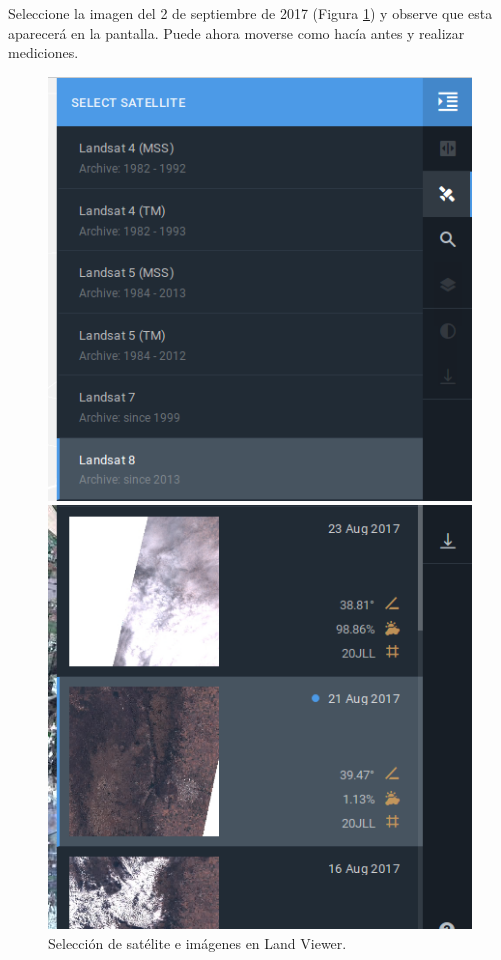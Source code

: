 \documentclass[a4paper,12pt]{book}
\begin{document}
Seleccione la imagen del 2 de septiembre de 2017 (Figura \ref{fig:scene}) y observe que esta aparecerá en la pantalla. Puede ahora moverse como hacía antes y realizar mediciones.

\begin{figure}[h!]
\centering
\begin{minipage}{.425\linewidth}
  \includegraphics[width=\linewidth]{fig:sat.png}
\end{minipage}
\hspace{.05\linewidth}
\begin{minipage}{.425\linewidth}
  \includegraphics[width=\linewidth]{fig:imagen1.png}
\end{minipage}
\caption{Selección de satélite e imágenes en Land Viewer.}
\label{fig:scene}
\end{figure}
\end{document}
